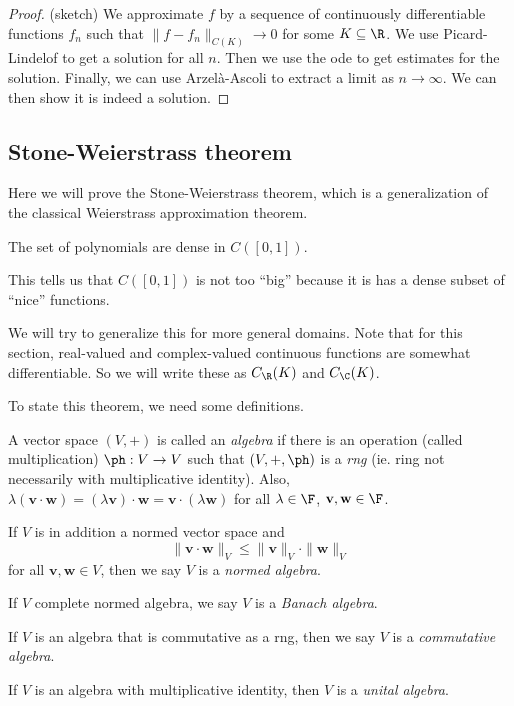\documentclass[a4paper]{article}
\begin{document}
\begin{proof}(sketch)
  We approximate $f$ by a sequence of continuously differentiable functions $f_n$ such that $\|f - f_n\|_{C(K)} \to 0$ for some $K\subseteq \R$. We use Picard-Lindelof to get a solution for all $n$. Then we use the ode to get estimates for the solution. Finally, we can use Arzel\`a-Ascoli to extract a limit as $n \to \infty$. We can then show it is indeed a solution.
\end{proof}

\subsection{Stone-Weierstrass theorem}
Here we will prove the Stone-Weierstrass theorem, which is a generalization of the classical Weierstrass approximation theorem.
\begin{thm}
  The set of polynomials are dense in $C([0, 1])$.
\end{thm}
This tells us that $C([0, 1])$ is not too ``big'' because it is has a dense subset of ``nice'' functions.

We will try to generalize this for more general domains. Note that for this section, real-valued and complex-valued continuous functions are somewhat differentiable. So we will write these as $C_{\R}(K)$ and $C_{\C}(K)$.

To state this theorem, we need some definitions.

\begin{defi}[Algebra]
  A vector space $(V, +)$ is called an \emph{algebra} if there is an operation (called multiplication) $\ph: V \to V$ such that $(V, +, \ph)$ is a \emph{rng} (ie. ring not necessarily with multiplicative identity). Also, $\lambda(\mathbf{v}\cdot \mathbf{w}) = (\lambda \mathbf{v})\cdot \mathbf{w} = \mathbf{v}\cdot (\lambda \mathbf{w})$ for all $\lambda \in \F$, $\mathbf{v}, \mathbf{w} \in \F$.

  If $V$ is in addition a normed vector space and
  \[
    \|\mathbf{v}\cdot \mathbf{w}\|_V \leq \|\mathbf{v}\|_V \cdot \|\mathbf{w}\|_V
  \]
  for all $\mathbf{v}, \mathbf{w} \in V$, then we say $V$ is a \emph{normed algebra}.

  If $V$ complete normed algebra, we say $V$ is a \emph{Banach algebra}.

  If $V$ is an algebra that is commutative as a rng, then we say $V$ is a \emph{commutative algebra}.

  If $V$ is an algebra with multiplicative identity, then $V$ is a \emph{unital algebra}.
\end{defi}
\end{document}
